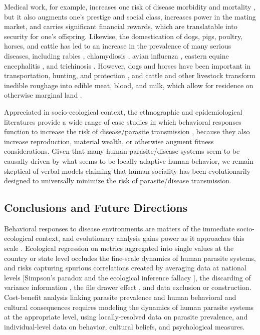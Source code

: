 \documentclass[12pt]{article}
\begin{document}
	 Medical work, for example, increases one risk of disease morbidity and mortality \citep{pearson1992nosocomial}, but it also augments one's prestige and social class, increases power in the mating market, and carries significant financial rewards, which are translatable into security for one's offspring. Likewise, the domestication of dogs, pigs, poultry, horses, and cattle has led to an increase in the prevalence of many serious diseases, including rabies \citep{wandeler1993ecology},  chlamydiosis \citep{jacob2005avian}, avian influenza \citep{mounts1999case}, eastern equine encephalitis \citep{jacob2005avian}, and trichinosis \citep{gould1970trichinosis}. However, dogs and horses have been important in transportation, hunting, and protection \citep{brown2012ancient,koster2008hunting}, and cattle and other livestock transform inedible roughage into edible meat, blood, and milk, which allow for residence on otherwise marginal land  \citep{mace1993transitions}. 
	
	 Appreciated in socio-ecological context, the ethnographic and epidemiological literatures provide a wide range of case studies in which behavioral responses function to increase the risk of disease/parasite transmission \citep{molineaux1980garki, vaughn1992epidemiology, allen2008mice,  rothenberg2009hiv, parad2012psychological, pittphilsci9767}, because they also increase reproduction, material wealth, or otherwise augment fitness considerations. Given that many human-parasite/disease systems seem to be causally driven by what seems to be locally adaptive human behavior, we remain skeptical of verbal models claiming that human sociality has been evolutionarily designed to universally minimize the risk of parasite/disease transmission.
 
\subsection{Conclusions and Future Directions}
		Behavioral responses to disease environments are matters of the immediate socio-ecological context, and evolutionary analysis gains power as it approaches this scale \citep{winterhalder1997evolutionary}.  Ecological regression on metrics aggregated into single values at the country or state level occludes the fine-scale dynamics of human parasite systems, and risks capturing spurious correlations created by averaging data at national levels [Simpson's paradox \citep{simpson1951interpretation} and the ecological inference fallacy \citep{Freedman1999}], the discarding of variance information \citep{draper1995assessment}, the file drawer effect \citep{cassey2004survey, palmer1999detecting}, and data exclusion \citep{palmer1999detecting} or construction. Cost-benefit analysis linking parasite prevalence and human behavioral and cultural consequences requires modeling the dynamics of human parasite systems at the appropriate level, using locally-resolved data on parasite prevalence, and individual-level data on behavior, cultural beliefs, and psychological measures. 
\end{document}

